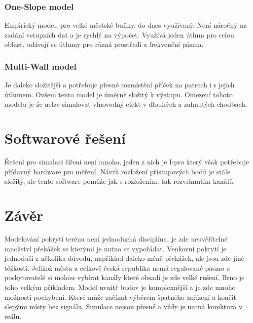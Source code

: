 \documentclass[paper=a4, fontsize=11pt]{scrartcl}
\numberwithin{equation}{section}
\numberwithin{figure}{section}
\numberwithin{table}{section}
\begin{document}
	\subsubsection{One-Slope model}
	Empirický model, 
	pro velké městské buňky, 
	do dnes využívaný. 
	Není náročný na zadání vstupních dat a je rychlý na výpočet. 
	Využívá jeden útlum pro celou oblast, 
	udávají se útlumy pro různá prostředí a frekvenční pásma.
	\subsubsection{Multi-Wall model}
	Je daleko složitější a potřebuje přesné rozmístění příček na patrech i s jejich útlumem. 
	Ovšem tento model je úměrně složitý k výstupu. 
	Omezení tohoto modelu je že nelze simulovat vlnovodný efekt v dlouhých a zahnutých chodbách.
\newpage

\section{Softwarové řešení}
Řešení pro simulaci šíření není mnoho, 
jeden z nich je I-pro který však potřebuje přídavný hardware pro měření. 
Návrh rozložení přístupových bodů je stále složitý, 
ale tento software pomůže jak s rozložením, 
tak rozvrhnutím kanálů.

\section{Závěr}
Modelování pokrytí terénu není jednoduchá disciplína, 
je zde neuvěřitelné množství překážek se kterými je nutno se vypořádat. 
Venkovní pokrytí je jednoduší z několika důvodů, 
například daleko méně překážek, 
ale jsou zde jiné těžkosti. 
Jelikož města a celkově česká republika nemá regulované pásmo 
a poskytovatelé si mohou vybírat kanály které obsadí je zde velké rušení, 
Brno je toho velkým příkladem. 
Model uvnitř budov je komplexnější a je zde mnoho možností pochybení. 
Které může začínat výběrem špatného zařízení a končit slepými místy bez signálu. 
Simulace nejsou přesné a vždy je nutná korektura v reálu.
\end{document}
